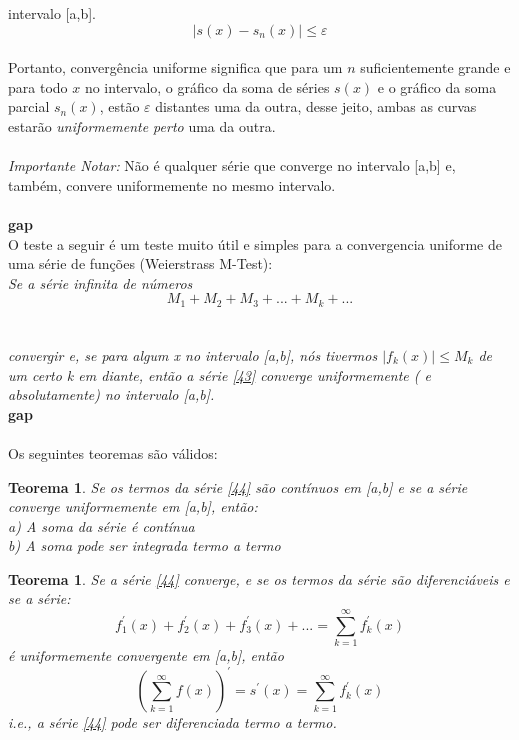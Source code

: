 \documentclass{article}
\begin{document}
intervalo [a,b].\\
\begin{equation}
    |s(x) - s_n(x)| \leq \varepsilon
\end{equation}
\\
Portanto, convergência uniforme significa que para um $n$ suficientemente 
grande e para todo $x$ no intervalo, o gráfico da soma de séries $s(x)$ e o 
gráfico da soma parcial $s_n(x)$, estão $\varepsilon$ distantes uma da outra,
desse jeito, ambas as curvas estarão \textit{uniformemente perto} uma da outra.\\
\\
\textit{Importante Notar:}
Não é qualquer série que converge no intervalo [a,b] e, também, convere uniformemente
no mesmo intervalo.\\
\\
\textbf{gap} 
\\
O teste a seguir é um teste muito útil e simples para a convergencia uniforme
de uma série de funções (Weierstrass M-Test):\\
\textit{
    Se a série infinita de números \\
    \begin{equation}
        M_1 + M_2 + M_3 + ... + M_k + ...
    \end{equation}
    \\
    \\
    convergir e, se para algum x no intervalo [a,b], nós tivermos $|f_k(x)| \leq M_k$
    de um certo k em diante, então a série \ref{43} converge uniformemente ( e 
    absolutamente) no intervalo [a,b].
} 
\\
\textbf{gap}\\
\\
Os seguintes teoremas são válidos:

\newtheorem{teo1}{Teorema}
\begin{teo1}
    Se os termos da série \ref{44} são contínuos em [a,b] e se a
    série converge uniformemente em [a,b], então:\\
    a) A soma da série é contínua\\
    b) A soma pode ser integrada termo a termo
\end{teo1}

\newtheorem{teo2}{Teorema}
\begin{teo2}
    Se a série \ref{44} converge, e se os termos da série são diferenciáveis
    e se a série:\\
    \begin{equation}
        f_1^{'}(x) + f_2^{'}(x) + f_3^{'}(x) + ... = \sum\limits_{k=1}^{\infty}f_k^{'}(x)
    \end{equation}
    é uniformemente convergente em [a,b], então\\
    \begin{equation}
        (\sum\limits_{k=1}^{\infty} f(x))^{'} = s^{'}(x) = \sum\limits_{k=1}^{\infty}f_k^{'}(x)
    \end{equation}
    i.e., a série \ref{44} pode ser diferenciada termo a termo.
\end{teo2}
\end{document}
